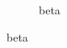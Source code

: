 \begin{figure}[h]
    \begin{subfigure}
        \texttt{[image: beta.png]}
        \caption{beta}
    \end{subfigure}
\end{figure}